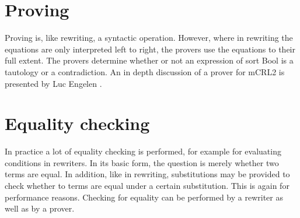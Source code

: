 \documentclass[a4paper,11pt]{article}
\begin{document}
% 

\section{Proving}
Proving is, like rewriting, a syntactic operation. However, where in rewriting the equations are only interpreted left to right, the provers use the equations to their full extent. The provers determine whether or not an expression of sort Bool is a tautology or a contradiction. An in depth discussion of a prover for mCRL2 is presented by Luc Engelen \cite{engelen2006}.

\section{Equality checking}
In practice a lot of equality checking is performed, for example for evaluating conditions in rewriters. In its basic form, the question is merely whether two terms are equal. In addition, like in rewriting, substitutions may be provided to check whether to terms are equal under a certain substitution. This is again for performance reasons. Checking for equality can be performed by a rewriter as well as by a prover.
\end{document}
